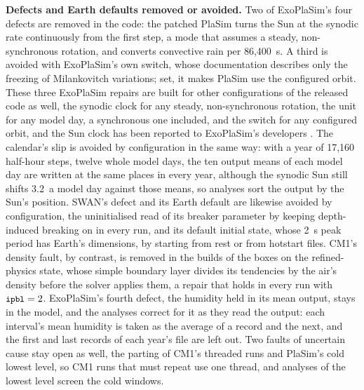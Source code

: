 \textbf{Defects and Earth defaults removed or avoided.} Two of ExoPlaSim's four defects are removed in the code: the
patched PlaSim turns the Sun at the synodic rate continuously from the first step, a mode that assumes a
steady, non-synchronous rotation, and converts convective rain per 86,400~s. A third is avoided with
ExoPlaSim's own  switch, whose documentation describes only the freezing of Milankovitch
variations; set, it makes PlaSim use the configured orbit. These three ExoPlaSim repairs are built for other
configurations of the released code as well, the synodic clock for any steady, non-synchronous rotation, the
unit for any model day, a synchronous one included, and the switch for any configured orbit, and the Sun clock
has been reported to ExoPlaSim's developers \autocite{goldman2026solang}. The calendar's slip is avoided by
configuration in the same way: with a year of 17,160 half-hour steps, twelve whole model days, the ten output
means of each model day are written at the same places in every year, although the synodic Sun still shifts
3.2\textdegree\ a model day against those means, so analyses sort the output by the Sun's position. SWAN's
defect and its Earth default are likewise avoided by configuration, the uninitialised read of its breaker
parameter by keeping depth-induced breaking on in every run, and its default initial state, whose 2~s peak
period has Earth's dimensions, by starting from rest or from hotstart files. CM1's density fault, by contrast, is removed in the builds of
the boxes on the refined-physics state, whose simple boundary layer divides its tendencies by the air's density
before the solver applies them, a repair that holds in every run with $\texttt{\small ipbl} = 2$. ExoPlaSim's
fourth defect, the humidity held in its mean output, stays in the model, and the analyses correct for it as they
read the output: each interval's mean humidity is taken as the average of a record and the next, and the first and
last records of each year's file are left out. Two faults of uncertain cause stay open as well, the
parting of CM1's threaded runs and PlaSim's cold lowest level, so CM1 runs that must repeat use one thread, and analyses of the
lowest level screen the cold windows.

